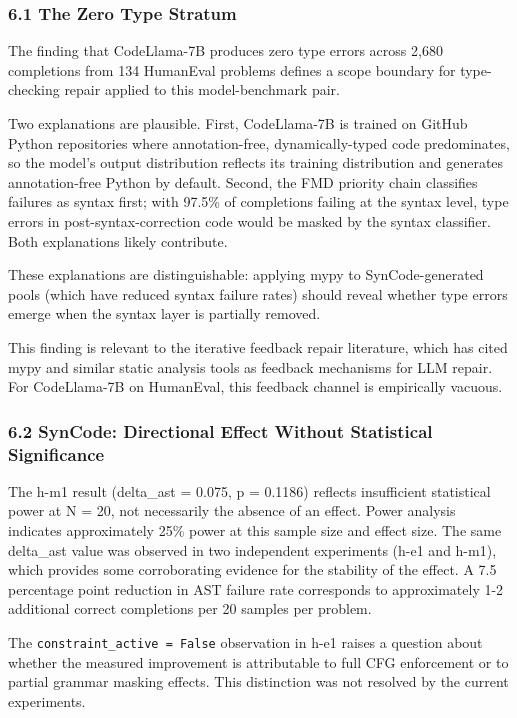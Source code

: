 
\subsubsection{6.1 The Zero Type Stratum}

The finding that CodeLlama-7B produces zero type errors across 2,680 completions from 134 HumanEval problems defines a scope boundary for type-checking repair applied to this model-benchmark pair.

Two explanations are plausible. First, CodeLlama-7B is trained on GitHub Python repositories where annotation-free, dynamically-typed code predominates, so the model's output distribution reflects its training distribution and generates annotation-free Python by default. Second, the FMD priority chain classifies failures as syntax first; with 97.5\% of completions failing at the syntax level, type errors in post-syntax-correction code would be masked by the syntax classifier. Both explanations likely contribute.

These explanations are distinguishable: applying mypy to SynCode-generated pools (which have reduced syntax failure rates) should reveal whether type errors emerge when the syntax layer is partially removed.

This finding is relevant to the iterative feedback repair literature, which has cited mypy and similar static analysis tools as feedback mechanisms for LLM repair. For CodeLlama-7B on HumanEval, this feedback channel is empirically vacuous.

\subsubsection{6.2 SynCode: Directional Effect Without Statistical Significance}

The h-m1 result (delta_ast = 0.075, p = 0.1186) reflects insufficient statistical power at N = 20, not necessarily the absence of an effect. Power analysis indicates approximately 25\% power at this sample size and effect size. The same delta_ast value was observed in two independent experiments (h-e1 and h-m1), which provides some corroborating evidence for the stability of the effect. A 7.5 percentage point reduction in AST failure rate corresponds to approximately 1-2 additional correct completions per 20 samples per problem.

The \texttt{constraint_active = False} observation in h-e1 raises a question about whether the measured improvement is attributable to full CFG enforcement or to partial grammar masking effects. This distinction was not resolved by the current experiments.

